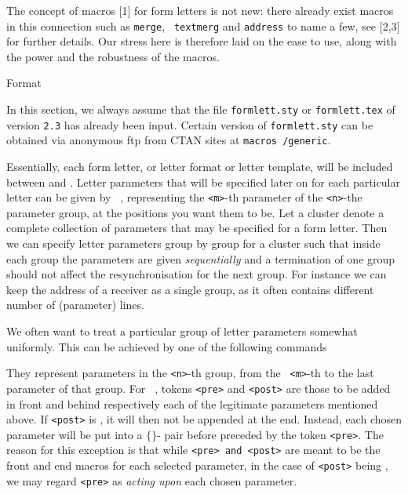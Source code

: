 {\medskip

The concept of macros [1] for form letters is not new: there
already exist macros in this connection such as {\tt merge}, {\tt
textmerg} and {\tt address} to name a few, see [2,3] for further
details. Our stress here is therefore laid on the ease to use,
along with the power and the robustness of the macros.

\bigskip
{\lbold Format}

\smallskip

In this section, we always assume that the file {\tt formlett.sty}
or {\tt formlett.tex} of version {\tt 2.3} has
already been input. Certain version of {\tt formlett.sty} can be
obtained via anonymous ftp from CTAN sites at
{\tt macros /generic}.

\medskip

Essentially, each form letter, or letter format or letter
template, will be included between {\tt \string\beginletter} and
{\tt \string\endletter}. Letter parameters that will be specified
later on for each particular letter can be given by {\tt
\string\paras[<m>][<n>]}, representing the {\tt <m>}-th parameter
of the {\tt<n>}-the parameter group, at the positions you want
them to be. Let a cluster denote a complete collection of
parameters that may be specified for a form letter. Then we can
specify letter parameters group by group for a cluster such that
inside each group the parameters are given {\sl sequentially} and
a termination of one group should not affect the
resynchronisation for the next group. For instance we can keep
the address of a receiver as a single group, as it often contains
different number of (parameter) lines.


\medskip
We often want to treat a particular group of letter
parameters somewhat uniformly. This can be achieved by one of the
following commands

\setraw
  \blockparas[<m>][<n>][<pre>][<post>]
  \addressparas[<m>][<n>][<width>][<indent>]
\unsetraw

They represent parameters in the {\tt<n>}-th group, from the {\tt
<m>}-th to the last parameter of that group. For {\tt
\string\blockparas}, tokens {\tt <pre>} and {\tt <post>} are
those to be added in front and behind respectively each of the
legitimate parameters mentioned above. If {\tt <post>} is
{\tt\string\relax}, it will then not be appended at the end.
Instead, each chosen parameter will be put into a {\tt $\{\}$}-
pair before preceded by the token {\tt <pre>}. The reason for
this exception is that while {\tt <pre> and <post>} are meant to
be the front and end macros for each selected parameter, in the
case of {\tt <post>} being {\tt \string\relax}, we may regard
{\tt<pre>} as {\sl acting upon} each chosen parameter.


}
